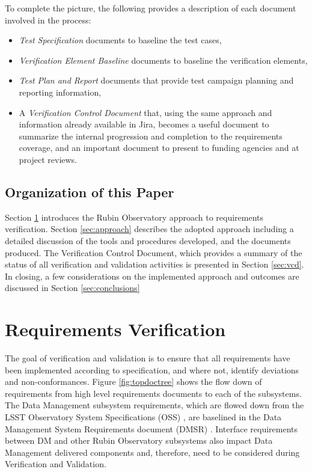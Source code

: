 To complete the picture, the following provides a description of each document involved in the process:
\begin{itemize}
\item  {\textit{Test Specification} documents to baseline the test cases, }
\item {\textit{Verification Element Baseline} documents to baseline the verification elements,}
\item  {\textit{Test Plan and Report} documents that provide test campaign planning and reporting information,}
\item  {A \textit{Verification Control Document} that, using the same approach and information already available in Jira, becomes a useful document to summarize the  internal progression and completion to the requirements coverage, and an important document to present to funding agencies and at project reviews. }
\end{itemize}

\subsection{Organization of this Paper}
Section \ref{sec:vandvproblem} introduces the Rubin Observatory approach to requirements verification. 
Section \ref{sec:approach} describes the adopted approach including a detailed discussion of the tools and procedures developed,  and the documents produced. 
The Verification Control Document, which provides a summary of the status of all verification and validation activities is presented in Section \ref{sec:vcd}.  
In closing, a few considerations on the implemented approach and outcomes are discussed in Section \ref{sec:conclusions} 

\section{Requirements Verification}
\label{sec:vandvproblem}
The goal of verification and validation is to ensure that all requirements have been implemented according to specification, and where not, identify deviations and non-conformances. 
Figure \ref{fig:topdoctree} shows the flow down of requirements from high level requirements documents to each of the subsystems. 
The Data Management subsystem requirements, which are flowed down from the LSST Observatory System Specifications (OSS) \cite{LSE-30}, are baselined in the Data Management System Requirements document (DMSR) \cite{LSE-61}.
Interface requirements between DM and other Rubin Observatory subsystems also impact Data Management delivered components and, therefore, need to be considered during Verification and Validation.

